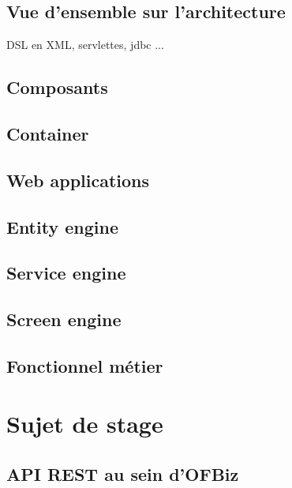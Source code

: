\subsection{Vue d'ensemble sur l'architecture}
DSL en XML, servlettes, jdbc ...
\subsection{Composants }

\subsection{Container}
\subsection{Web applications}
\subsection{Entity engine}
\subsection{Service engine}
\subsection{Screen engine}
\subsection{Fonctionnel métier}

\newpage
\section{Sujet de stage }



\subsection{API REST au sein d'OFBiz}
